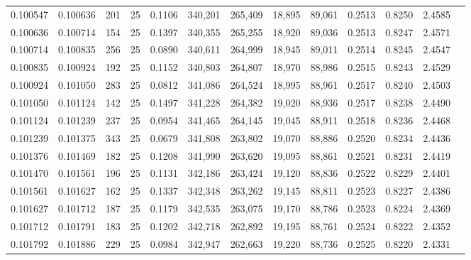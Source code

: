 \begin{tabular}{rrrrrrrrrrrrr}
0.100547 & 0.100636 &   201 &  25 &                                     0.1106 & 340,201 & 265,409 &  18,895 &  89,061 & 0.2513 & 0.8250 & 2.4585 \\
0.100636 & 0.100714 &   154 &  25 &                                     0.1397 & 340,355 & 265,255 &  18,920 &  89,036 & 0.2513 & 0.8247 & 2.4571 \\
0.100714 & 0.100835 &   256 &  25 &                                     0.0890 & 340,611 & 264,999 &  18,945 &  89,011 & 0.2514 & 0.8245 & 2.4547 \\
0.100835 & 0.100924 &   192 &  25 &                                     0.1152 & 340,803 & 264,807 &  18,970 &  88,986 & 0.2515 & 0.8243 & 2.4529 \\
0.100924 & 0.101050 &   283 &  25 &                                     0.0812 & 341,086 & 264,524 &  18,995 &  88,961 & 0.2517 & 0.8240 & 2.4503 \\
0.101050 & 0.101124 &   142 &  25 &                                     0.1497 & 341,228 & 264,382 &  19,020 &  88,936 & 0.2517 & 0.8238 & 2.4490 \\
0.101124 & 0.101239 &   237 &  25 &                                     0.0954 & 341,465 & 264,145 &  19,045 &  88,911 & 0.2518 & 0.8236 & 2.4468 \\
0.101239 & 0.101375 &   343 &  25 &                                     0.0679 & 341,808 & 263,802 &  19,070 &  88,886 & 0.2520 & 0.8234 & 2.4436 \\
0.101376 & 0.101469 &   182 &  25 &                                     0.1208 & 341,990 & 263,620 &  19,095 &  88,861 & 0.2521 & 0.8231 & 2.4419 \\
0.101470 & 0.101561 &   196 &  25 &                                     0.1131 & 342,186 & 263,424 &  19,120 &  88,836 & 0.2522 & 0.8229 & 2.4401 \\
0.101561 & 0.101627 &   162 &  25 &                                     0.1337 & 342,348 & 263,262 &  19,145 &  88,811 & 0.2523 & 0.8227 & 2.4386 \\
0.101627 & 0.101712 &   187 &  25 &                                     0.1179 & 342,535 & 263,075 &  19,170 &  88,786 & 0.2523 & 0.8224 & 2.4369 \\
0.101712 & 0.101791 &   183 &  25 &                                     0.1202 & 342,718 & 262,892 &  19,195 &  88,761 & 0.2524 & 0.8222 & 2.4352 \\
0.101792 & 0.101886 &   229 &  25 &                                     0.0984 & 342,947 & 262,663 &  19,220 &  88,736 & 0.2525 & 0.8220 & 2.4331 \\

\end{tabular}
